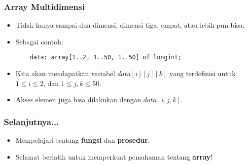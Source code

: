 \documentclass{beamer}
\begin{document}
\begin{frame}[fragile]
\frametitle{Array Multidimensi}
\begin{itemize}
	\item Tidak hanya sampai dua dimensi, dimensi tiga, empat, atau lebih pun bisa.
	\item Sebagai contoh:
	\begin{lstlisting}
	data: array[1..2, 1..50, 1..50] of longint;
	\end{lstlisting}
	\item Kita akan mendapatkan variabel $data[i][j][k]$ yang terdefinisi untuk $1 \le i \le 2$, dan $1 \le j, k \le 50$.
	\item Akses elemen juga bisa dilakukan dengan $data[i,j,k]$.
\end{itemize}
\end{frame}

\begin{frame}
\frametitle{Selanjutnya...}
\begin{itemize}
	\item Mempelajari tentang \textbf{fungsi} dan \textbf{prosedur}.
	\item Selamat berlatih untuk memperkuat pemahaman tentang \textbf{array}!
\end{itemize}
\end{frame}
\end{document}
